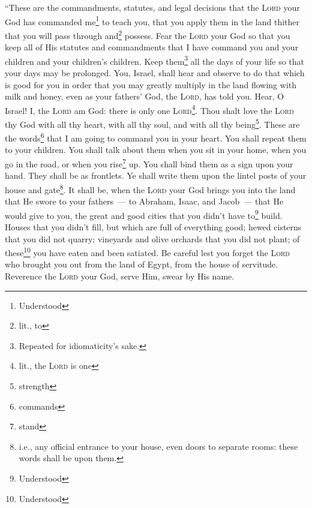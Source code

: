 
\begin{inparaenum}
     ``These are the commandments, statutes, and legal decisions that the \textsc{Lord} your God has commanded me\footnote{Understood} to teach you, that you apply them in the land thither that you will pass through and\footnote{lit., to} possess.%
     Fear the \textsc{Lord} your God so that you keep all of His statutes and commandments that I have command you and your children and your children's children. Keep them\footnote{Repeated for idiomaticity's sake.} all the days of your life so that your days may be prolonged.%
     You, Israel, shall hear and observe to do that which is good for you in order that you may greatly multiply in the land flowing with milk and honey, even as your fathers' God, the \textsc{Lord}, has told you.%
     Hear, O Israel! I, the \textsc{Lord} am God: there is only one \textsc{Lord}\footnote{lit., the \textsc{Lord} is one}.%
     Thou shalt love the \textsc{Lord} thy God with all thy heart, with all thy soul, and with all thy being\footnote{strength}.%
     These are the words\footnote{commands} that I am going to command you in your heart.%
     You shall repeat them to your children. You shall talk about them when you sit in your home, when you go in the road, or when you rise\footnote{stand} up.%
     You shall bind them as a sign upon your hand. They shall be as frontlets.%
     Ye shall write them upon the lintel posts of your house and gate\footnote{i.e., any official entrance to your house, even doors to separate rooms: these words shall be upon them.}.%
     It shall be, when the \textsc{Lord} your God brings you into the land that He swore to your fathers~--- to Abraham, Isaac, and Jacob~--- that He would give to you, the great and good cities that you didn't have to\footnote{Understood} build.%
     Houses that you didn't fill, but which are full of everything good; hewed cisterns that you did not quarry; vineyards and olive orchards that you did not plant; of these\footnote{Understood} you have eaten and been satiated.%
     Be careful lest you forget the \textsc{Lord} who brought you out from the land of Egypt, from the house of servitude.%
     Reverence the \textsc{Lord} your God, serve Him, swear by His name.%
\end{inparaenum}
